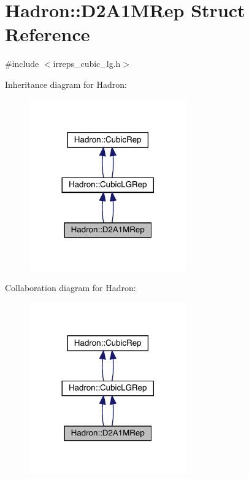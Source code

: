 \hypertarget{structHadron_1_1D2A1MRep}{}\section{Hadron\+:\+:D2\+A1\+M\+Rep Struct Reference}
\label{structHadron_1_1D2A1MRep}


{\ttfamily \#include $<$irreps\+\_\+cubic\+\_\+lg.\+h$>$}



Inheritance diagram for Hadron\+:\nopagebreak
\begin{figure}[H]
\begin{center}
\leavevmode
\includegraphics[width=192pt]{d7/d12/structHadron_1_1D2A1MRep__inherit__graph}
\end{center}
\end{figure}


Collaboration diagram for Hadron\+:\nopagebreak
\begin{figure}[H]
\begin{center}
\leavevmode
\includegraphics[width=192pt]{d3/d3d/structHadron_1_1D2A1MRep__coll__graph}
\end{center}
\end{figure}
